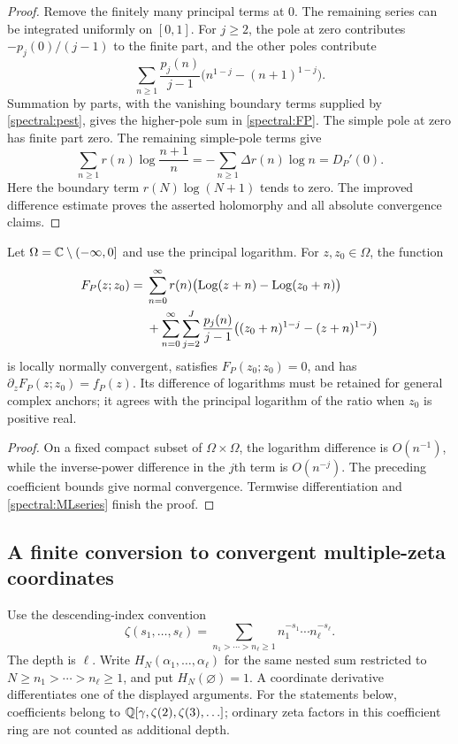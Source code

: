 \begin{proof}
Remove the finitely many principal terms at $0$.  The remaining series
can be integrated uniformly on $[0,1]$.  For $j\geq2$, the pole at zero
contributes $-p_j(0)/(j-1)$ to the finite part, and the other poles
contribute
\[
 \sum_{n\geq1}\frac{p_j(n)}{j-1}
                  \bigl(n^{1-j}-(n+1)^{1-j}\bigr).
\]
Summation by parts, with the vanishing boundary terms supplied by
\eqref{spectral:pest}, gives the higher-pole sum in
\eqref{spectral:FP}.  The simple pole at zero has finite part zero.
The remaining simple-pole terms give
\[
 \sum_{n\geq1}r(n)\log\frac{n+1}{n}
     =-\sum_{n\geq1}\Delta r(n)\log n=D_P'(0).
\]
Here the boundary term $r(N)\log(N+1)$ tends to zero.  The improved
difference estimate proves the asserted holomorphy and all absolute
convergence claims.
\end{proof}

\begin{corollary}\label{spectral:primitive}
Let $\Omega=\mathbb C\setminus(-\infty,0]$ and use the principal logarithm.
For $z,z_0\in\Omega$, the function
\begin{align}\label{spectral:primitiveformula}
 F_P(z;z_0)={}&\sum_{n=0}^{\infty}r(n)
       \bigl(\operatorname{Log}(z+n)-\operatorname{Log}(z_0+n)\bigr)
       \notag\\
 &+\sum_{n=0}^{\infty}\sum_{j=2}^{J}\frac{p_j(n)}{j-1}
       \bigl((z_0+n)^{1-j}-(z+n)^{1-j}\bigr)
\end{align}
is locally normally convergent, satisfies $F_P(z_0;z_0)=0$, and has
$\partial_zF_P(z;z_0)=f_P(z)$.  Its difference of logarithms must be
retained for general complex anchors; it agrees with the principal
logarithm of the ratio when $z_0$ is positive real.
\end{corollary}

\begin{proof}
On a fixed compact subset of $\Omega\times\Omega$, the logarithm
difference is $O(n^{-1})$, while the inverse-power difference in the
$j$th term is $O(n^{-j})$.  The preceding coefficient bounds give normal
convergence.  Termwise differentiation and
\eqref{spectral:MLseries} finish the proof.
\end{proof}

\subsection{A finite conversion to convergent multiple-zeta coordinates}

Use the descending-index convention
\[
 \zeta(s_1,\ldots,s_\ell)
    =\sum_{n_1>\cdots>n_\ell\geq1}
       n_1^{-s_1}\cdots n_\ell^{-s_\ell}.
\]
The depth is $\ell$.  Write $H_N(\alpha_1,\ldots,\alpha_\ell)$ for the
same nested sum restricted to $N\geq n_1>\cdots>n_\ell\geq1$, and put
$H_N(\varnothing)=1$.  A coordinate derivative differentiates one
of the displayed arguments.  For the statements below, coefficients
belong to $\mathbb Q[\gamma,\zeta(2),\zeta(3),\ldots]$; ordinary zeta factors
in this coefficient ring are not counted as additional depth.

